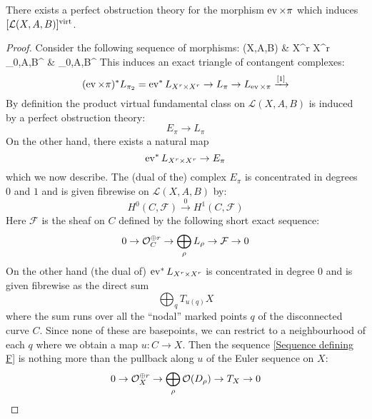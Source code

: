 \begin{lemma} There exists a perfect obstruction theory for the morphism $\operatorname{ev} \times \pi$ which induces $[\mathcal{L}(X,A,B)]^{\operatorname{virt}}$. \end{lemma}

\begin{proof} Consider the following sequence of morphisms:
\bcd
{}(X,A,B) \ar[r,"\ev \times \pi"] \ar[rr, bend right = 20, "\pi"] & X^r \times X^r \times \MM_{0,A,B}^{} \ar[r,"\pi_2"] & \MM_{0,A,B}^{}
\ecd
This induces an exact triangle of contangent complexes:
\begin{equation*} (\operatorname{ev} \times \pi)^* L_{\pi_2} = \operatorname{ev}^* L_{X^r \times X^r} \rightarrow L_\pi \rightarrow L_{\operatorname{ev} \times \pi} \xrightarrow{[1]} \end{equation*}
By definition the product virtual fundamental class on $\mathcal{L}(X,A,B)$ is induced by a perfect obstruction theory:
\begin{equation*} E_\pi \to L_\pi \end{equation*}
On the other hand, there exists a natural map
\begin{equation*} \operatorname{ev}^* L_{X^r \times X^r} \rightarrow E_\pi \end{equation*}
which we now describe. The (dual of the) complex $E_\pi$ is concentrated in degrees $0$ and $1$ and is given fibrewise on $\mathcal{L}(X,A,B)$ by:
\begin{equation*} H^0(C,\mathcal{F}) \xrightarrow{0} H^1(C,\mathcal{F}) \end{equation*}
Here $\mathcal{F}$ is the sheaf on $C$ defined by the following short exact sequence:
\begin{equation} \label{Sequence defining F} 0 \rightarrow \mathcal{O}_C^{\oplus r} \rightarrow \bigoplus_{\rho} L_\rho \rightarrow \mathcal{F} \rightarrow 0 \end{equation}
On the other hand (the dual of) $\operatorname{ev}^* L_{X^r \times X^r}$ is concentrated in degree $0$ and is given fibrewise as the direct sum
\begin{equation*} \bigoplus_q T_{u(q)} X \end{equation*}
where the sum runs over all the ``nodal'' marked points $q$ of the disconnected curve $C$. Since none of these are basepoints, we can restrict to a neighbourhood of each $q$ where we obtain a map $u: C \to X$. Then the sequence \eqref{Sequence defining F} is nothing more than the pullback along $u$ of the Euler sequence on $X$:
\begin{equation*} 0 \rightarrow \mathcal{O}_X^{\oplus r} \rightarrow \bigoplus_\rho \mathcal{O}(D_\rho) \rightarrow T_X \rightarrow 0 \end{equation*}

\end{proof}

